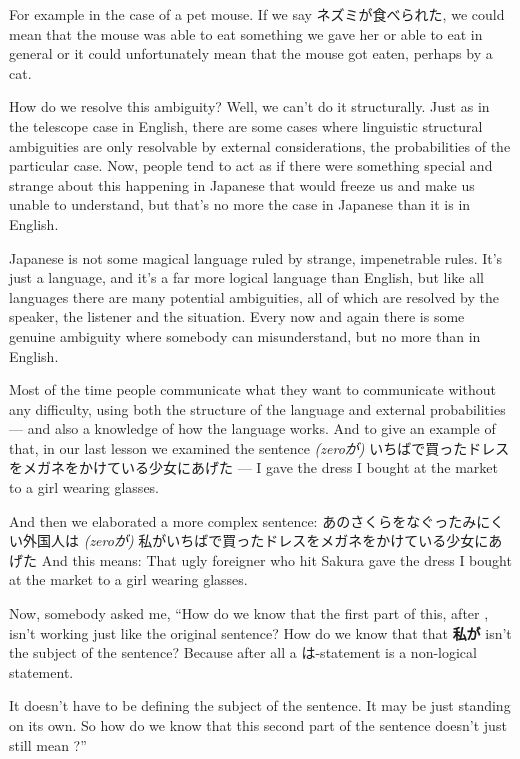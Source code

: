 For example in the case of a pet mouse. If we say ネズミが食べられた, we could mean that the mouse was able to eat something we gave her or able to eat in general or it could unfortunately mean that the mouse got eaten, perhaps by a cat.

{}

How do we resolve this ambiguity? Well, we can't do it structurally. Just as in the telescope case in English, there are some cases where linguistic structural ambiguities are only resolvable by external considerations, the probabilities of the particular case. Now, people tend to act as if there were something special and strange about this happening in Japanese that would freeze us and make us unable to understand, but that's no more the case in Japanese than it is in English.

Japanese is not some magical language ruled by strange, impenetrable rules. It's just a language, and it's a far more logical language than English, but like all languages there are many potential ambiguities, all of which are resolved by the speaker, the listener and the situation. Every now and again there is some genuine ambiguity where somebody can misunderstand, but no more than in English.

Most of the time people communicate what they want to communicate without any difficulty, using both the structure of the language and external probabilities --- and also a knowledge of how the language works. And to give an example of that, in our last lesson we examined the sentence {\em (zeroが)} いちばで買ったドレスをメガネをかけている少女にあげた --- I gave the dress I bought at the market to a girl wearing glasses.

{}

And then we elaborated a more complex sentence: あのさくらをなぐったみにくい外国人は {\em (zeroが)} 私がいちばで買ったドレスをメガネをかけている少女にあげた And this means: That ugly foreigner who hit Sakura gave the dress I bought at the market to a girl wearing glasses.

{}

Now, somebody asked me, “How do we know that the first part of this, after , isn't working just like the original sentence? How do we know that that {\bf 私が} isn't the subject of the sentence? Because after all a は-statement is a non-logical statement.

It doesn't have to be defining the subject of the sentence. It may be just standing on its own. So how do we know that this second part of the sentence doesn't just still mean ?”

